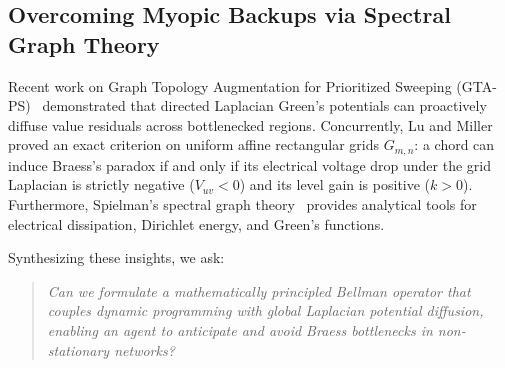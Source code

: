\documentclass[11pt,a4paper]{article}
\begin{document}
\subsection{Overcoming Myopic Backups via Spectral Graph Theory}
Recent work on Graph Topology Augmentation for Prioritized Sweeping (GTA-PS)~\cite{gta_ps2025} demonstrated that directed Laplacian Green's potentials can proactively diffuse value residuals across bottlenecked regions. Concurrently, Lu and Miller~\cite{lu2026braess} proved an exact criterion on uniform affine rectangular grids $G_{m,n}$: a chord can induce Braess's paradox if and only if its electrical voltage drop under the grid Laplacian is strictly negative ($V_{uv} < 0$) and its level gain is positive ($k > 0$). Furthermore, Spielman's spectral graph theory~\cite{spielman2025sagt} provides analytical tools for electrical dissipation, Dirichlet energy, and Green's functions.

Synthesizing these insights, we ask:
\begin{quote}
\textit{Can we formulate a mathematically principled Bellman operator that couples dynamic programming with global Laplacian potential diffusion, enabling an agent to anticipate and avoid Braess bottlenecks in non-stationary networks?}
\end{quote}
\end{document}
